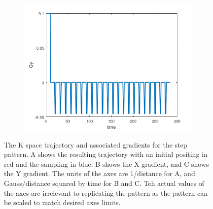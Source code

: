 \documentclass[12pt]{article}
\begin{document}
\begin{figure}[H]
\begin{subfigure}{0.5\textwidth}
	\includegraphics[width=\textwidth]{Figures/StepGy.png}
	\caption{}
	\label{Fig:stepGy}
\end{subfigure}
\caption{The K space trajectory and associated gradients for the step pattern. A shows the resulting trajectory with an initial positing in red and the sampling in blue. B shows the X gradient, and C shows the Y gradient. The units of the axes are 1/distance for A, and Gauss/distance squared by time for B and C. Teh actual values of the axes are irrelevant to replicating the pattern as the pattern can be scaled to match desired axes limits.}
\label{fig:step}
\end{figure}
\end{document}
